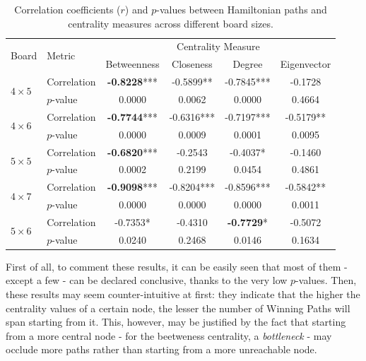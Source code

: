 \documentclass[conference]{IEEEtran}
\begin{document}
\begin{table}[ht]
	\centering
	\setlength{\tabcolsep}{3.9pt}
	\begin{tabular}{|llcccc|}
		\toprule
		\multirow{2}{*}{Board} & \multirow{2}{*}{Metric} & \multicolumn{4}{c}{Centrality Measure} \\
		\cmidrule(lr){3-6}
		& & Betweenness & Closeness & Degree & Eigenvector \\
		\midrule
		\multirow{2}{*}{$4 \times 5$} 
		& Correlation & \textbf{-0.8228}*** & -0.5899** & -0.7845*** & -0.1728 \\
		& $p$-value   & 0.0000 & 0.0062 & 0.0000 & 0.4664 \\
		\midrule
		\multirow{2}{*}{$4 \times 6$} 
		& Correlation & \textbf{-0.7744}*** & -0.6316*** & -0.7197*** & -0.5179** \\
		& $p$-value   & 0.0000 & 0.0009 & 0.0001 & 0.0095 \\
		\midrule
		\multirow{2}{*}{$5 \times 5$} 
		& Correlation & \textbf{-0.6820}*** & -0.2543 & -0.4037* & -0.1460 \\
		& $p$-value   & 0.0002 & 0.2199 & 0.0454 & 0.4861 \\
		\midrule
		\multirow{2}{*}{$4 \times 7$} 
		& Correlation & \textbf{-0.9098}*** & -0.8204*** & -0.8596*** & -0.5842** \\
		& $p$-value   & 0.0000 & 0.0000 & 0.0000 & 0.0011 \\
		\midrule
		\multirow{2}{*}{$5 \times 6$} 
		& Correlation & -0.7353* & -0.4310 & \textbf{-0.7729}* & -0.5072 \\
		& $p$-value   & 0.0240 & 0.2468 & 0.0146 & 0.1634 \\
		\bottomrule
	\end{tabular}
	\caption{Correlation coefficients ($r$) and $p$-values between Hamiltonian paths and centrality measures across different board sizes.}
	\label{tab:correlations}
\end{table}

First of all, to comment these results, it can be easily seen that most of them - except a few - can be declared conclusive, thanks to the very low $p$-values.
Then, these results may seem counter-intuitive at first: they indicate that the higher the centrality values of a certain node, the lesser the number of Winning Paths will span starting from it. This, however, may be justified by the fact that starting from a more central node - for the beetweness centrality, a \textit{bottleneck} - may occlude more paths rather than starting from a more unreachable node.
\end{document}
